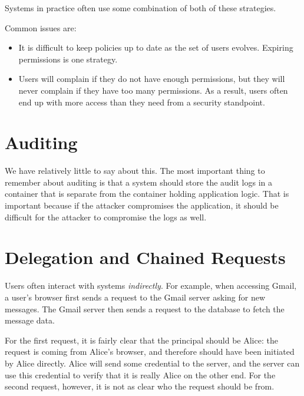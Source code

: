 Systems in practice often use some combination of both of these strategies.

Common issues are:
\begin{itemize}
  \item It is difficult to keep policies up to date as the set of users evolves.
        Expiring permissions is one strategy.
  \item Users will complain if they do not have enough permissions, but they will
        never complain if they have too many permissions. As a result, users
        often end up with more access than they need from a security standpoint.
\end{itemize}


\section{Auditing}

We have relatively little to say about this.
The most important thing to remember about auditing is
that a system should store the audit logs in a container
that is separate from the container holding application logic.
That is important because if the attacker compromises
the application, it should be difficult for the attacker
to compromise the logs as well.


\section{Delegation and Chained Requests}
Users often interact with systems \emph{indirectly}.
For example, when accessing Gmail, a user's browser first sends a request to the Gmail server asking for new messages. The Gmail server then sends a request to the database to fetch the message data.

For the first request, it is fairly clear that the principal should be Alice: the request is coming from Alice's browser, and therefore should have been initiated by Alice directly. Alice will send some credential to the server, and the server can use this credential to verify that it is really Alice on the other end. For the second request, however, it is not as clear who the request should be from.

